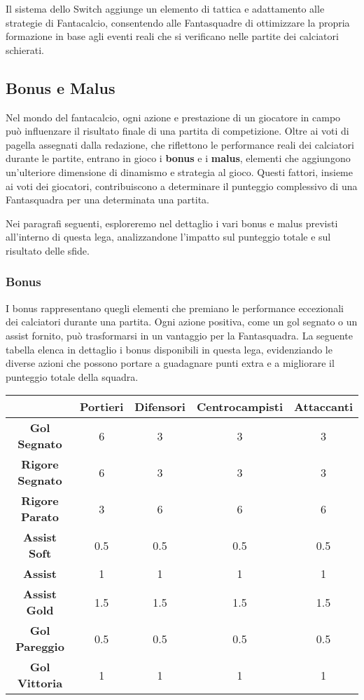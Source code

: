 \documentclass[12pt]{article}
\begin{document}
Il sistema dello Switch aggiunge un elemento di tattica e adattamento alle strategie di Fantacalcio, consentendo alle Fantasquadre di ottimizzare la propria formazione in base agli eventi reali che si verificano nelle partite dei calciatori schierati.

\subsection{Bonus e Malus}
Nel mondo del fantacalcio, ogni azione e prestazione di un giocatore in campo può influenzare il risultato finale di una partita di competizione. Oltre ai voti di pagella assegnati dalla redazione, che riflettono le performance reali dei calciatori durante le partite, entrano in gioco i \textbf{bonus} e i \textbf{malus}, elementi che aggiungono un'ulteriore dimensione di dinamismo e strategia al gioco. Questi fattori, insieme ai voti dei giocatori, contribuiscono a determinare il punteggio complessivo di una Fantasquadra per una determinata una partita.

Nei paragrafi seguenti, esploreremo nel dettaglio i vari bonus e malus previsti all'interno di questa lega, analizzandone l'impatto sul punteggio totale e sul risultato delle sfide.

\subsubsection{Bonus}
I bonus rappresentano quegli elementi che premiano le performance eccezionali dei calciatori durante una partita. Ogni azione positiva, come un gol segnato o un assist fornito, può trasformarsi in un vantaggio per la Fantasquadra. La seguente tabella elenca in dettaglio i bonus disponibili in questa lega, evidenziando le diverse azioni che possono portare a guadagnare punti extra e a migliorare il punteggio totale della squadra.
\newline
\\
\begin{tabular}{|c|c|c|c|c|}
    \hline
     & \textbf{Portieri} & \textbf{Difensori} & \textbf{Centrocampisti} & \textbf{Attaccanti} \\
    \hline
    \textbf{Gol Segnato} & 6 & 3 & 3 & 3 \\
    \hline
    \textbf{Rigore Segnato} & 6 & 3 & 3 & 3 \\
    \hline
    \textbf{Rigore Parato} & 3 & 6 & 6 & 6 \\
    \hline
    \textbf{Assist Soft} & 0.5 & 0.5 & 0.5 & 0.5 \\
    \hline
    \textbf{Assist} & 1 & 1 & 1 & 1 \\
    \hline
    \textbf{Assist Gold} & 1.5 & 1.5 & 1.5 & 1.5 \\
    \hline
    \textbf{Gol Pareggio} & 0.5 & 0.5 & 0.5 & 0.5 \\
    \hline
    \textbf{Gol Vittoria} & 1 & 1 & 1 & 1 \\
    \hline
  \end{tabular}
\newline 
\end{document}
